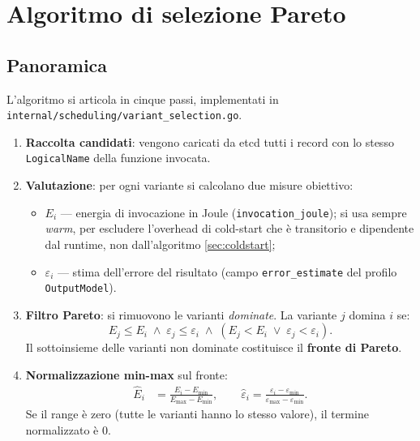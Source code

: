 \documentclass[a4paper,12pt]{article}
\begin{document}
\section{Algoritmo di selezione Pareto}

\subsection{Panoramica}

L'algoritmo si articola in cinque passi, implementati in
\texttt{internal/scheduling/variant\_selection.go}.

\begin{enumerate}
  \item \textbf{Raccolta candidati}: vengono caricati da etcd tutti i
        record con lo stesso \texttt{LogicalName} della funzione
        invocata.

  \item \textbf{Valutazione}: per ogni variante si calcolano due
        misure obiettivo:
        \begin{itemize}
          \item $E_i$ --- energia di invocazione in Joule
                (\texttt{invocation\_joule}); si usa sempre
                \emph{warm}, per escludere l'overhead di cold-start
                che è transitorio e dipendente dal runtime, non
                dall'algoritmo \textsection\ref{sec:coldstart};
          \item $\varepsilon_i$ --- stima dell'errore del risultato
                (campo \texttt{error\_estimate} del profilo
                \texttt{OutputModel}).
        \end{itemize}

  \item \textbf{Filtro Pareto}: si rimuovono le varianti
        \emph{dominate}. La variante $j$ domina $i$ se:
        \begin{equation}\label{eq:dom}
          E_j \le E_i \;\land\; \varepsilon_j \le \varepsilon_i
          \;\land\; (E_j < E_i \;\lor\; \varepsilon_j < \varepsilon_i).
        \end{equation}
        Il sottoinsieme delle varianti non dominate costituisce il
        \textbf{fronte di Pareto}.

  \item \textbf{Normalizzazione min-max} sul fronte:
        \begin{align}
          \hat{E}_i &= \frac{E_i - E_{\min}}{E_{\max} - E_{\min}},
          \qquad
          \hat{\varepsilon}_i = \frac{\varepsilon_i - \varepsilon_{\min}}
                                     {\varepsilon_{\max} - \varepsilon_{\min}}.
        \end{align}
        Se il range è zero (tutte le varianti hanno lo stesso valore),
        il termine normalizzato è 0.


\end{enumerate}
\end{document}

